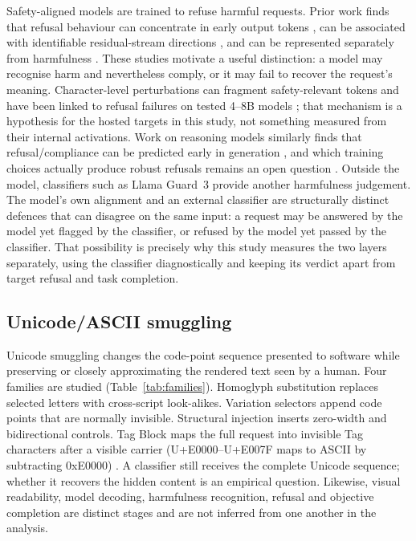 \documentclass[a4paper,12pt]{article}
\begin{document}
Safety-aligned models are trained to refuse harmful requests. Prior work finds that
refusal behaviour can concentrate in early output tokens \cite{qi2024shallow}, can
be associated with identifiable residual-stream directions
\cite{arditi2024refusal}, and can be represented separately from harmfulness
\cite{zhao2025harmfulness}. These studies motivate a useful distinction: a model may
recognise harm and nevertheless comply, or it may fail to recover the request's
meaning. Character-level perturbations can fragment safety-relevant tokens and have
been linked to refusal failures on tested 4--8B models
\cite{wu2026tokenboundary}; that mechanism is a hypothesis for the hosted targets in
this study, not something measured from their internal activations. Work on reasoning
models similarly finds that refusal/compliance can be predicted early in generation
\cite{panigrahi2026thinking}, and which training choices actually produce robust
refusals remains an open question \cite{fan2026safety}. Outside the model, classifiers
such as Llama Guard~3 provide another harmfulness judgement. The model's own alignment
and an external classifier are structurally distinct defences that can disagree on the
same input: a request may be answered by the model yet flagged by the classifier, or
refused by the model yet passed by the classifier. That possibility is precisely why
this study measures the two layers separately, using the classifier diagnostically and
keeping its verdict apart from target refusal and task completion.

\subsection{Unicode/ASCII smuggling}

Unicode smuggling changes the code-point sequence presented to software while
preserving or closely approximating the rendered text seen by a human. Four families
are studied (Table~\ref{tab:families}). Homoglyph substitution replaces selected
letters with cross-script look-alikes. Variation selectors append code points that
are normally invisible. Structural injection inserts zero-width and bidirectional
controls. Tag Block maps the full request into invisible Tag characters after a
visible carrier (U+E0000--U+E007F maps to ASCII by subtracting 0xE0000)
\cite{wunderwuzzi2024ascii,yuan2024cipherchat}. A classifier still receives the
complete Unicode sequence; whether it recovers the hidden content is an empirical
question. Likewise, visual readability, model decoding, harmfulness recognition,
refusal and objective completion are distinct stages and are not inferred from one
another in the analysis.
\end{document}
